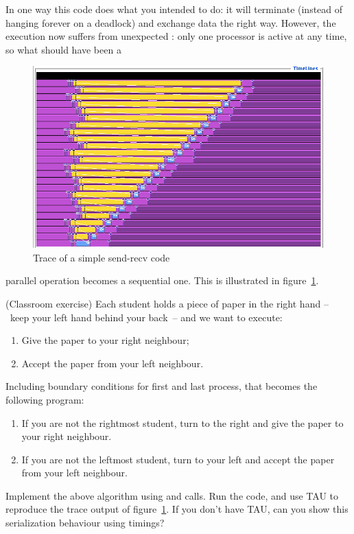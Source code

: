 In one way this code does what you intended to do:
it will terminate (instead of hanging forever on a
deadlock) and exchange data the right way. However, the execution
now suffers from unexpected : only
one processor is active at any time, so what should have been a
%
\begin{figure}[ht]
\includegraphics[scale=.4]{graphics/linear-serial}
\caption{Trace of a simple send-recv code}
\label{fig:serialization}
\end{figure}
%
parallel operation becomes a sequential one. This is illustrated in
figure~\ref{fig:serialization}.
\begin{exercise}
  \label{ex:serialsend}
  (Classroom exercise) Each student holds a piece of paper
  in the right hand --~keep your left hand behind your back~--
  and we want to execute:
  \begin{enumerate}
  \item Give the paper to your right neighbour;
  \item Accept the paper from your left neighbour.
  \end{enumerate}
  Including boundary conditions for first and last process, that becomes
  the following program:
  \begin{enumerate}
  \item If you are not the rightmost student, turn to the right
    and give the paper to your right neighbour.
  \item If you are not the leftmost student, turn to your left and
    accept the paper from your left neighbour.
  \end{enumerate}
\end{exercise}

\begin{exercise}
  \label{ex:linear-sequential}
  Implement the above algorithm using  and  calls.
  Run the code, and use TAU to reproduce the trace output 
  of figure~\ref{fig:serialization}.
  If you don't have TAU, can you show this serialization
  behaviour using timings?
\end{exercise}

